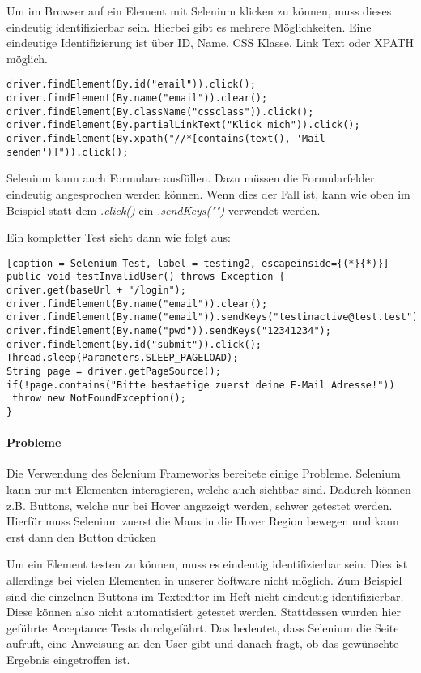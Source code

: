 Um im Browser auf ein Element mit Selenium klicken zu können, muss dieses eindeutig identifizierbar sein. Hierbei gibt es mehrere Möglichkeiten. Eine eindeutige Identifizierung ist über ID, Name, CSS Klasse, Link Text oder XPATH möglich. \cite{SELENIUMID}

\begin{lstlisting}[caption = Selenium Element Selektoren, label = testing1]
driver.findElement(By.id("email")).click();
driver.findElement(By.name("email")).clear();
driver.findElement(By.className("cssclass")).click();
driver.findElement(By.partialLinkText("Klick mich")).click();
driver.findElement(By.xpath("//*[contains(text(), 'Mail senden')]")).click();
\end{lstlisting}

Selenium kann auch Formulare ausfüllen. Dazu müssen die Formularfelder eindeutig angesprochen werden können. Wenn dies der Fall ist, kann wie oben im Beispiel statt dem \textit{.click()} ein \textit{.sendKeys("")} verwendet werden. 

\newpage

Ein kompletter Test sieht dann wie folgt aus:
\begin{lstlisting}[caption = Selenium Test, label = testing2, escapeinside={(*}{*)}]
public void testInvalidUser() throws Exception {
driver.get(baseUrl + "/login");
driver.findElement(By.name("email")).clear();
driver.findElement(By.name("email")).sendKeys("testinactive@test.test");
driver.findElement(By.name("pwd")).sendKeys("12341234");
driver.findElement(By.id("submit")).click();
Thread.sleep(Parameters.SLEEP_PAGELOAD);
String page = driver.getPageSource();
if(!page.contains("Bitte bestaetige zuerst deine E-Mail Adresse!"))
 throw new NotFoundException();
}
\end{lstlisting}

\paragraph{Probleme}
Die Verwendung des Selenium Frameworks bereitete einige Probleme. Selenium kann nur mit Elementen interagieren, welche auch sichtbar sind. Dadurch können z.B. Buttons, welche nur bei Hover angezeigt werden, schwer getestet werden. Hierfür muss Selenium zuerst die Maus in die Hover Region bewegen und kann erst dann den Button drücken 

Um ein Element testen zu können, muss es eindeutig identifizierbar sein. Dies ist allerdings bei vielen Elementen in unserer Software nicht möglich. Zum Beispiel sind die einzelnen Buttons im Texteditor im Heft nicht eindeutig identifizierbar. Diese können also nicht automatisiert getestet werden. Stattdessen wurden hier geführte Acceptance Tests durchgeführt. Das bedeutet, dass Selenium die Seite aufruft, eine Anweisung an den User gibt und danach fragt, ob das gewünschte Ergebnis eingetroffen ist. 

